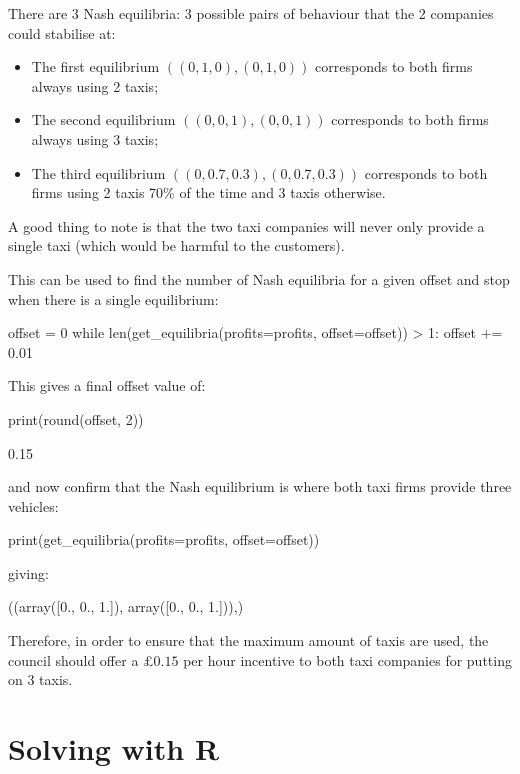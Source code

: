 There are 3 Nash equilibria: 3 possible pairs of behaviour that the 2
companies could stabilise at:

\begin{itemize}
    \item The first equilibrium \(((0, 1, 0), (0, 1, 0))\) corresponds to both
          firms always using 2 taxis;
    \item The second equilibrium \(((0, 0, 1), (0, 0, 1))\) corresponds to both
          firms always using 3 taxis;
    \item The third equilibrium \(((0, 0.7, 0.3), (0, 0.7, 0.3))\) corresponds to
          both firms using 2 taxis 70\% of the time and 3 taxis otherwise.
\end{itemize}

A good thing to note is that the two taxi companies will never only provide a
single taxi (which would be harmful to the customers).

This can be used to find the number of Nash equilibria for a given offset and
stop when there is a single equilibrium:

\begin{pyin}
offset = 0
while len(get_equilibria(profits=profits, offset=offset)) > 1:
    offset += 0.01
\end{pyin}

This gives a final offset value of:

\begin{pyin}
print(round(offset, 2))
\end{pyin}


\begin{pyout}
0.15
\end{pyout}

and now confirm that the Nash equilibrium is where both taxi firms provide
three vehicles:

\begin{pyin}
print(get_equilibria(profits=profits, offset=offset))
\end{pyin}

giving:

\begin{pyout}
((array([0., 0., 1.]), array([0., 0., 1.])),)
\end{pyout}

Therefore, in order to ensure that the maximum amount of taxis are used, the
council should offer a \(\pounds 0.15\) per hour incentive to both taxi
companies for putting on 3 taxis.

\section{Solving with R}\label{sec:solving-with-R}


